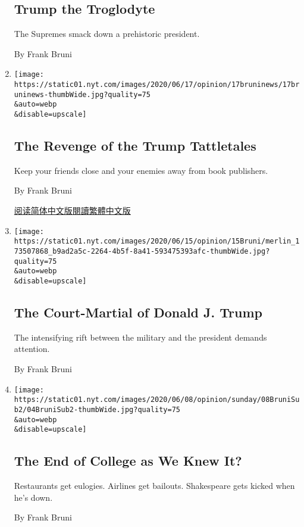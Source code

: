 \begin{enumerate}
  \hypertarget{trump-the-troglodyte}{%
  \subsection{Trump the Troglodyte}\label{trump-the-troglodyte}}

  The Supremes smack down a prehistoric president.

  By Frank Bruni
\item
  \href{/2020/06/17/opinion/trump-mary-book.html}{}

  \texttt{[image: https://static01.nyt.com/images/2020/06/17/opinion/17bruninews/17bruninews-thumbWide.jpg?quality=75\\\&auto=webp\\\&disable=upscale]}

  \hypertarget{the-revenge-of-the-trump-tattletales}{%
  \subsection{The Revenge of the Trump
  Tattletales}\label{the-revenge-of-the-trump-tattletales}}

  Keep your friends close and your enemies away from book publishers.

  By Frank Bruni

  \href{https://cn.nytimes.com/opinion/20200622/trump-mary-book/}{阅读简体中文版}\href{https://cn.nytimes.com/opinion/20200622/trump-mary-book/zh-hant/}{閱讀繁體中文版}
\item
  \href{/2020/06/15/opinion/trump-military.html}{}

  \texttt{[image: https://static01.nyt.com/images/2020/06/15/opinion/15Bruni/merlin\_173507868\_b9ad2a5c-2264-4b5f-8a41-593475393afc-thumbWide.jpg?quality=75\\\&auto=webp\\\&disable=upscale]}

  \hypertarget{the-court-martial-of-donald-j-trump}{%
  \subsection{The Court-Martial of Donald J.
  Trump}\label{the-court-martial-of-donald-j-trump}}

  The intensifying rift between the military and the president demands
  attention.

  By Frank Bruni
\item
  \href{/2020/06/04/opinion/sunday/coronavirus-college-humanities.html}{}

  \texttt{[image: https://static01.nyt.com/images/2020/06/08/opinion/sunday/08BruniSub2/04BruniSub2-thumbWide.jpg?quality=75\\\&auto=webp\\\&disable=upscale]}

  \hypertarget{the-end-of-college-as-we-knew-it}{%
  \subsection{The End of College as We Knew
  It?}\label{the-end-of-college-as-we-knew-it}}

  Restaurants get eulogies. Airlines get bailouts. Shakespeare gets
  kicked when he's down.

  By Frank Bruni
\end{enumerate}

